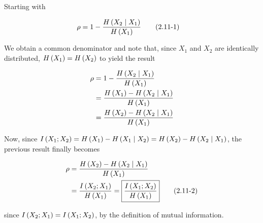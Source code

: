 \documentclass[ClusteringConnectionsMAIN.tex]{subfiles}
\begin{document}
	

  Starting with

\begin{align} \label{c2p11eq1}
\rho &= 1 - \frac{ H \left( X_2 \mid X_1 \right) }{ H \left( X_1 \right) }  \tag{2.11-1}
\end{align}

We obtain a common denominator and note that, since $X_1$ and $X_2$ are identically distributed, $H \left( X_1 \right) = H \left( X_2 \right)$ to yield the result

\begin{align} 
\rho &= 1 - \frac{ H \left( X_2 \mid X_1 \right) }{ H \left( X_1 \right) }   \notag \\
&= \frac{ H \left( X_1 \right) - H \left( X_2 \mid X_1 \right) }{ H \left( X_1 \right) }  \notag \\
&= \frac{ H \left( X_2 \right) - H \left( X_2 \mid X_1 \right) }{ H \left( X_1 \right) }  \notag
\end{align}

Now, since $I \left( X_1; X_2 \right) = H \left( X_1 \right) - H \left( X_1 \mid X_2 \right) = H \left( X_2 \right) - H \left( X_2 \mid X_1 \right)$, the previous result finally becomes

\begin{align} \label{c2p11eq2}
\rho &= \frac{ H \left( X_2 \right) - H \left( X_2 \mid X_1 \right) }{ H \left( X_1 \right) }  \notag \\
&= \frac{ I \left( X_2; X_1  \right) }{ H \left( X_1 \right) } = \boxed{ \frac{ I \left( X_1; X_2 \right) }{ H \left( X_1 \right) } }   \tag{2.11-2}
\end{align}

since $I \left( X_2; X_1 \right) = I \left( X_1; X_2 \right)$, by the definition of mutual information.
\end{document}

